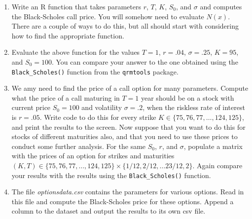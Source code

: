 \documentclass[12pt]{article}
\begin{document}
\begin{enumerate}
\item Write an R function that takes parameters $r$, $T$, $K$,
  $S_0$, and $\sigma$ and computes the Black-Scholes call price. You
  will somehow need to evaluate $N(x)$. There are a couple of ways
  to do this, but all should start with considering how to find the
  appropriate function.
\item Evaluate the above function for the values $T=1$, $r=.04$,
  $\sigma=.25$, $K=95$, and $S_0 = 100$. You can compare your answer
  to the one obtained using the \texttt{Black\_Scholes()} function from the \texttt{qrmtools} package. 
\item We amy need to find the price of a call option for many parameters.  Compute
  what the price of a call maturing in $T = 1$ year should be on a
  stock with current price $S_0 = 100$ and volatility $\sigma = .2$,
  when the riskless rate of interest is $r = .05$. Write code to do
  this for every strike $K \in \{75, 76, 77, \ldots, 124, 125\}$, and
  print the results to the screen.  Now suppose that you want to do
  this for stocks of different maturities also, and that you need to
  use these prices to conduct some further analysis. For the same
  $S_0$, $r$, and $\sigma$, populate a matrix with the prices of an
  option for strikes and maturities $(K,T) \in \{75, 76, 77, \ldots,
  124, 125\} \times \{1/12, 2/12, \ldots 23/12, 2\}$. Again compare
  your results with the results using the \texttt{Black\_Scholes()} function.
\item The file \emph{optionsdata.csv} contains the parameters for various
options. Read in this file and compute the Black-Scholes price for
these options. Append a column to the dataset and output the results
to its own csv file.
\end{enumerate}
\newpage
 
\end{document}
